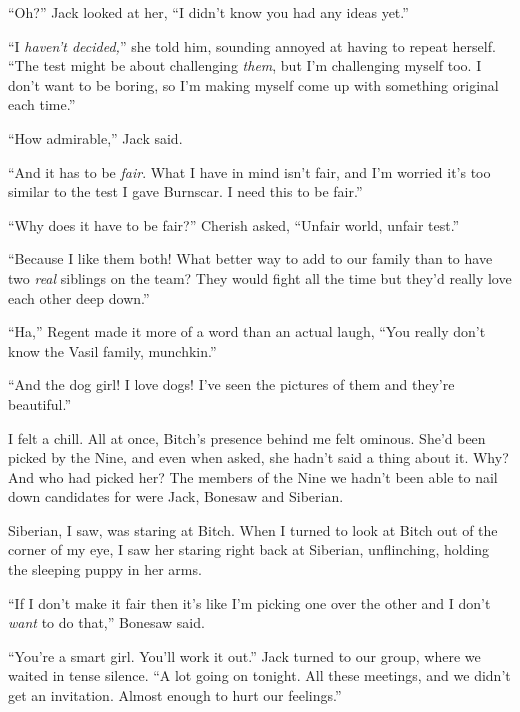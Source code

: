 ``Oh?'' Jack looked at her, ``I didn't know you had any ideas yet.''



``I \emph{haven't decided,}'' she told him, sounding annoyed at having to repeat herself.  ``The test might be about challenging \emph{them}, but I'm challenging myself too.  I don't want to be boring, so I'm making myself come up with something original each time.''



``How admirable,'' Jack said.



``And it has to be \emph{fair}.  What I have in mind isn't fair, and I'm worried it's too similar to the test I gave Burnscar.  I need this to be fair.''



``Why does it have to be fair?'' Cherish asked, ``Unfair world, unfair test.''



``Because I like them both!  What better way to add to our family than to have two \emph{real} siblings on the team?  They would fight all the time but they'd really love each other deep down.''



``Ha,'' Regent made it more of a word than an actual laugh, ``You really don't know the Vasil family, munchkin.''



``And the dog girl!  I love dogs!  I've seen the pictures of them and they're beautiful.''



I felt a chill.  All at once, Bitch's presence behind me felt ominous.  She'd been picked by the Nine, and even when asked, she hadn't said a thing about it.  Why?  And who had picked her?  The members of the Nine we hadn't been able to nail down candidates for were Jack, Bonesaw and Siberian.



Siberian, I saw, was staring at Bitch.  When I turned to look at Bitch out of the corner of my eye, I saw her staring right back at Siberian, unflinching, holding the sleeping puppy in her arms.



``If I don't make it fair then it's like I'm picking one over the other and I don't \emph{want} to do that,'' Bonesaw said.



``You're a smart girl.  You'll work it out.''  Jack turned to our group, where we waited in tense silence.  ``A lot going on tonight.  All these meetings, and we didn't get an invitation.  Almost enough to hurt our feelings.''



